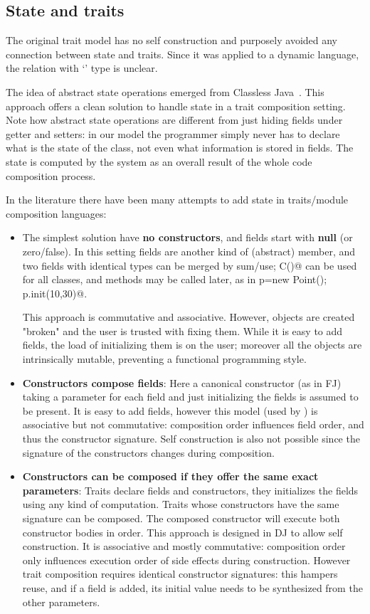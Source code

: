 \saveSpace
\subsection{State and traits}
\saveSpace
The original trait model has no self construction 
and purposely avoided any connection between state and traits.
Since it was applied to a dynamic language, the relation with `\Q@This@' type is unclear.

The idea of abstract state operations emerged from Classless
Java~\cite{wang2016classless}. This approach offers a clean solution to handle state
in a trait composition setting.
Note how abstract state operations are different from just hiding fields under getter and setters: 
in our model the programmer simply never has to declare what is the state of the class, not even what information is stored in fields.
The state is computed by the system as an overall result of the whole code composition process.

In the literature there have been many attempts to add state in traits/module composition languages:
\begin{itemize}  
\item The simplest solution have {\bf no constructors}, and fields start with {\bf null} (or zero/false).
In this setting fields are another kind of (abstract) member, and two fields with identical types can be merged by sum/use; \Q@new C()@ can be used for all classes, and \Q@init@ methods may be called later, as in
  \Q@Point p=new Point(); p.init(10,30)@.
  
This approach is commutative and associative.
  However, objects are created "broken" and the user is trusted with fixing them.
  While it is easy to add fields, the load of initializing them is on the user; moreover
    all the objects are intrinsically mutable, preventing a functional programming style.
\item {\bf Constructors compose fields}:
Here a canonical constructor (as in FJ) taking a parameter for each field and just initializing the fields is assumed to be present.
It is easy to add fields, however this model (used by \cite{fjig}) is associative but not commutative: composition order influences field order, and thus the constructor signature.
Self construction is also not possible 
since the signature of the constructors changes during composition.


\item {\bf Constructors can be composed if they offer the same exact parameters}:
Traits declare fields and constructors, they initializes the fields using any kind of computation.
Traits whose constructors have the same signature can be composed.
The composed constructor will execute both constructor bodies in order.
This approach is designed in DJ to allow self construction.
It is associative and mostly commutative: composition order only influences execution order of side effects during construction.
However trait composition requires identical constructor signatures: this
hampers reuse, and if a field is added, its initial value needs to be
synthesized from the other parameters.
\end{itemize}
\saveSpace\saveSpace
